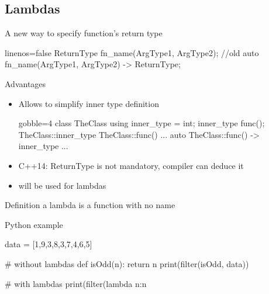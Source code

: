 \subsection[$\lambda$]{Lambdas}

\begin{frame}[fragile]
  \begin{block}{A new way to specify function's return type}
    \begin{cppcode*}{linenos=false}
      ReturnType fn_name(ArgType1, ArgType2);  //old
      auto fn_name(ArgType1, ArgType2) -> ReturnType;
    \end{cppcode*}
  \end{block}
  \pause
  \begin{block}{Advantages}
    \begin{itemize}
    \item Allows to simplify inner type definition
      \begin{cppcode*}{gobble=4}
        class TheClass {
          using inner_type = int;
          inner_type func();
        }
        TheClass::inner_type TheClass::func() {...}
        auto TheClass::func() -> inner_type {...}
      \end{cppcode*}
    \item C++14: ReturnType is not mandatory, compiler can deduce it
    \item will be used for lambdas
    \end{itemize}
  \end{block}
\end{frame}


\begin{frame}[fragile]
  \begin{block}{Definition}
    a lambda is a function with no name
  \end{block}
  \pause
  \begin{exampleblock}{Python example}
    \begin{pythoncode*}{}
      data = [1,9,3,8,3,7,4,6,5]

      # without lambdas
      def isOdd(n):
        return n%
      print(filter(isOdd, data))

      # with lambdas
      print(filter(lambda n:n%
    \end{pythoncode*}
  \end{exampleblock}
\end{frame}


